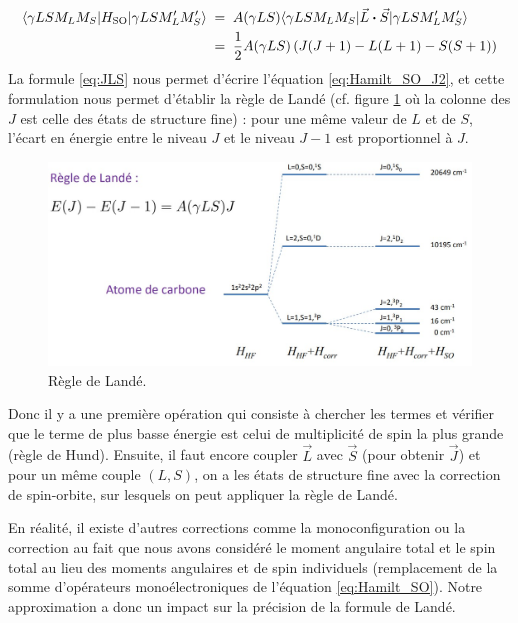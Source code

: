 \begin{align}
    \langle \gamma LSM_LM_S|H_\text{SO}|\gamma LSM_L'M_S' \rangle &\; = \;  A(\gamma LS)\langle \gamma LSM_LM_S|\vec{L}\boldsymbol{\cdot}\vec{S}|\gamma LSM_L'M_S' \rangle
    \label{eq:Hamilt_SO_J1}    \\
    &\; = \;
    \dfrac{1}{2}A(\gamma LS)\left( J(J+1)-L(L+1)-S(S+1)\right)
    \label{eq:Hamilt_SO_J2}
\end{align}
La formule \eqref{eq:JLS} nous permet d’écrire l'équation \eqref{eq:Hamilt_SO_J2}, et cette formulation nous permet d'établir la règle de Landé (cf. figure \ref{fig:RegleLandé} où la colonne des $J$ est celle des états de structure fine) : pour une même valeur de $L$ et de $S$, l’écart en énergie entre le niveau $J$ et le niveau $J-1$ est proportionnel à $J$.

\begin{figure}[htp]
    \centering
    \includegraphics[scale=0.50]{Images2/regleLande.jpg}
    \caption{Règle de Landé.}
    \label{fig:RegleLandé}
\end{figure}

Donc il y a une première opération qui consiste à chercher les termes et vérifier que le terme de plus basse énergie est celui de multiplicité de spin la plus grande (règle de Hund). Ensuite, il faut encore coupler $\vec{L}$ avec $\vec{S}$ (pour obtenir $\vec{J}$) et pour un même couple $(L,S)$, on a les états de structure fine avec la correction de spin-orbite, sur lesquels on peut appliquer la règle de Landé.

En réalité, il existe d'autres corrections comme la monoconfiguration ou la correction au fait que nous avons considéré le moment angulaire total et le spin total au lieu des moments angulaires et de spin individuels (remplacement de la somme d'opérateurs monoélectroniques de l'équation \eqref{eq:Hamilt_SO}). Notre approximation a donc un impact sur la précision de la formule de Landé.

